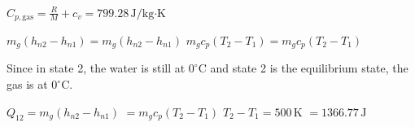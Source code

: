 \( C_{p,\text{gas}} = \frac{R}{M} + c_v = 799.28 \, \text{J/kg·K} \)  

\( m_g (h_{n2} - h_{n1}) = m_g (h_{n2} - h_{n1}) \)  
\( m_g c_p (T_2 - T_1) = m_g c_p (T_2 - T_1) \)  

Since in state 2, the water is still at \( 0^\circ \text{C} \) and state 2 is the equilibrium state, the gas is at \( 0^\circ \text{C} \).  

\( Q_{12} = m_g (h_{n2} - h_{n1}) \)  
\( = m_g c_p (T_2 - T_1) \)  
\( T_2 - T_1 = 500 \, \text{K} \)  
\( = 1366.77 \, \text{J} \)